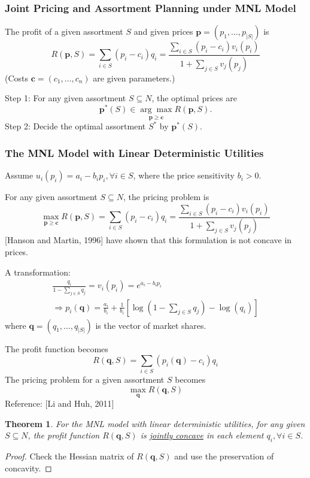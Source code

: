 \documentclass[11pt,a4paper]{article}
\newtheorem{theorem}{Theorem}
\begin{document}
\subsubsection{ Joint Pricing and Assortment Planning under MNL Model}
The profit of a given assortment $S$ and given prices $\mathbf{p}=\left(p_{1}, \ldots, p_{|S|}\right)$ is
$$
R(\mathbf{p}, S)=\sum_{i \in S}\left(p_{i}-c_{i}\right) q_{i}=\frac{\sum_{i \in S}\left(p_{i}-c_{i}\right) v_{i}\left(p_{i}\right)}{1+\sum_{j \in S} v_{j}\left(p_{j}\right)}
$$
(Costs $\mathbf{c}=\left(c_{1}, \ldots, c_{n}\right)$ are given parameters.)

Step 1: For any given assortment $S \subseteq N$, the optimal prices are
$$
\mathbf{p}^{*}(S) \in \underset{\mathbf{p} \geq \mathbf{c}}{\arg \max } R(\mathbf{p}, S) .
$$
Step 2: Decide the optimal assortment $S^{*}$ by $\mathbf{p}^{*}(S)$.

\subsubsection{ The MNL Model with Linear Deterministic Utilities}
Assume $u_{i}\left(p_{i}\right)=a_{i}-b_{i} p_{i}, \forall i \in S$, where the price sensitivity $b_{i}>0$.

For any given assortment $S \subseteq N$, the pricing problem is
$$
\max _{\mathbf{p} \geq \mathbf{c}} R(\mathbf{p}, S)=\sum_{i \in S}\left(p_{i}-c_{i}\right) q_{i}=\frac{\sum_{i \in S}\left(p_{i}-c_{i}\right) v_{i}\left(p_{i}\right)}{1+\sum_{j \in S} v_{j}\left(p_{j}\right)}
$$
[Hanson and Martin, 1996] have shown that this formulation is not concave in prices.

A transformation:
$$
\begin{gathered}
\frac{q_{i}}{1-\sum_{j \in S} q_{j}}=v_{i}\left(p_{i}\right)=e^{a_{i}-b_{i} p_{i}} \\
\Rightarrow p_{i}(\mathbf{q})=\frac{a_{i}}{b_{i}}+\frac{1}{b_{i}}\left[\log \left(1-\sum_{j \in S} q_{j}\right)-\log \left(q_{i}\right)\right]
\end{gathered}
$$
where $\mathbf{q}=\left(q_{1}, \ldots, q_{|S|}\right)$ is the vector of market shares.

The profit function becomes
$$
R(\mathbf{q}, S)=\sum_{i \in S}\left(p_{i}(\mathbf{q})-c_{i}\right) q_{i}
$$
The pricing problem for a given assortment $S$ becomes
$$
\max _{\mathbf{q}} R(\mathbf{q}, S)
$$
Reference: [Li and Huh, 2011]

\begin{theorem}
    For the MNL model with linear deterministic utilities, for any given $S \subseteq N$, the profit function $R(\mathbf{q}, S)$ is \underline{jointly concave} in each element $q_{i}, \forall i \in S$.
\end{theorem}
\begin{proof}
    Check the Hessian matrix of $R(\mathbf{q}, S)$ and use the preservation of concavity.
\end{proof}
\end{document}
